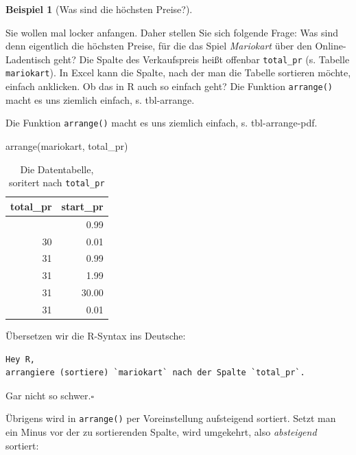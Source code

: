 \documentclass[
  a4paper,
]{scrbook}
\newenvironment{Shaded}{\begin{snugshade}}{\end{snugshade}}
\newcommand{\FunctionTok}[1]{\textcolor[rgb]{0.28,0.35,0.67}{#1}}
\newcommand{\NormalTok}[1]{\textcolor[rgb]{0.00,0.23,0.31}{#1}}
\theoremstyle{definition}
\newtheorem{example}{Beispiel}[chapter]
\theoremstyle{definition}
\theoremstyle{definition}
\theoremstyle{remark}
\begin{document}
\begin{example}[Was sind die höchsten
Preise?]\protect\hypertarget{exm-arrange1}{}\label{exm-arrange1}

Sie wollen mal locker anfangen. Daher stellen Sie sich folgende Frage:
Was sind denn eigentlich die höchsten Preise, für die das Spiel
\emph{Mariokart} über den Online-Ladentisch geht? Die Spalte des
Verkaufspreis heißt offenbar \texttt{total\_pr} (s. Tabelle
\texttt{mariokart}). In Excel kann die Spalte, nach der man die Tabelle
sortieren möchte, einfach anklicken. Ob das in R auch so einfach geht?
Die Funktion \texttt{arrange()} macht es uns ziemlich einfach, s.
tbl-arrange.

Die Funktion \texttt{arrange()} macht es uns ziemlich einfach, s.
tbl-arrange-pdf.

\begin{Shaded}
\begin{Highlighting}[]
\FunctionTok{arrange}\NormalTok{(mariokart, total\_pr) }
\end{Highlighting}
\end{Shaded}

\begin{longtable}[]{@{}rr@{}}

\caption{\label{tbl-arrange-pdf}Die Datentabelle, soritert nach
\texttt{total\_pr}}

\tabularnewline

\toprule\noalign{}
total\_pr & start\_pr \\
\midrule\noalign{}
\endhead
\bottomrule\noalign{}
\endlastfoot
29 & 0.99 \\
30 & 0.01 \\
31 & 0.99 \\
31 & 1.99 \\
31 & 30.00 \\
31 & 0.01 \\

\end{longtable}

Übersetzen wir die R-Syntax ins Deutsche:

\begin{verbatim}
Hey R,
arrangiere (sortiere) `mariokart` nach der Spalte `total_pr`.
\end{verbatim}

Gar nicht so schwer.\(\square\)

\end{example}

Übrigens wird in \texttt{arrange()} per Voreinstellung aufsteigend
sortiert. Setzt man ein Minus vor der zu sortierenden Spalte, wird
umgekehrt, also \emph{absteigend} sortiert:
\end{document}
